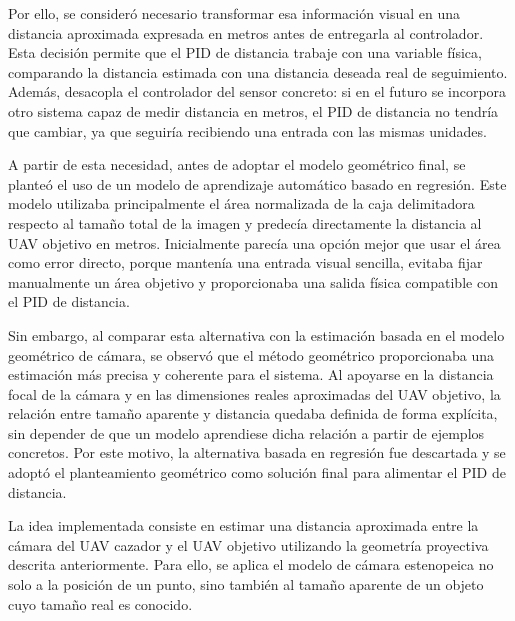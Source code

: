 \vspace{0.3cm}

Por ello, se consideró necesario transformar esa información visual en una distancia aproximada expresada en metros antes de entregarla al controlador. Esta decisión permite que el PID de distancia trabaje con una variable física, comparando la distancia estimada con una distancia deseada real de seguimiento. Además, desacopla el controlador del sensor concreto: si en el futuro se incorpora otro sistema capaz de medir distancia en metros, el PID de distancia no tendría que cambiar, ya que seguiría recibiendo una entrada con las mismas unidades.

\vspace{0.3cm}

A partir de esta necesidad, antes de adoptar el modelo geométrico final, se planteó el uso de un modelo de aprendizaje automático basado en regresión. Este modelo utilizaba principalmente el área normalizada de la caja delimitadora respecto al tamaño total de la imagen y predecía directamente la distancia al UAV objetivo en metros. Inicialmente parecía una opción mejor que usar el área como error directo, porque mantenía una entrada visual sencilla, evitaba fijar manualmente un área objetivo y proporcionaba una salida física compatible con el PID de distancia.

\vspace{0.3cm}

Sin embargo, al comparar esta alternativa con la estimación basada en el modelo geométrico de cámara, se observó que el método geométrico proporcionaba una estimación más precisa y coherente para el sistema. Al apoyarse en la distancia focal de la cámara y en las dimensiones reales aproximadas del UAV objetivo, la relación entre tamaño aparente y distancia quedaba definida de forma explícita, sin depender de que un modelo aprendiese dicha relación a partir de ejemplos concretos. Por este motivo, la alternativa basada en regresión fue descartada y se adoptó el planteamiento geométrico como solución final para alimentar el PID de distancia.

\vspace{0.3cm}

La idea implementada consiste en estimar una distancia aproximada entre la cámara del UAV cazador y el UAV objetivo utilizando la geometría proyectiva descrita anteriormente. Para ello, se aplica el modelo de cámara estenopeica no solo a la posición de un punto, sino también al tamaño aparente de un objeto cuyo tamaño real es conocido.

